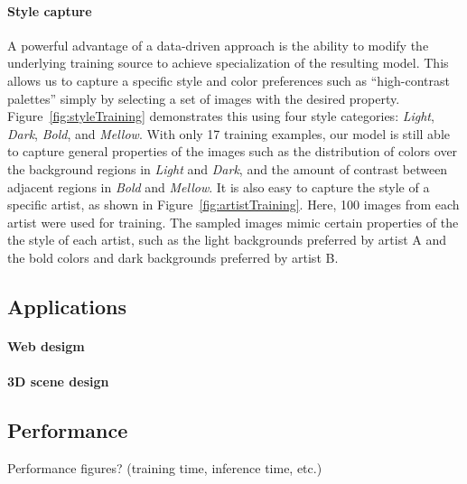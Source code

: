 \paragraph{Style capture} A powerful advantage of a data-driven approach is the ability to modify the underlying training source to achieve specialization of the resulting model. This allows us to capture a specific style and color preferences such as ``high-contrast palettes'' simply by selecting a set of images with the desired property. Figure~\ref{fig:styleTraining} demonstrates this using four style categories: \emph{Light}, \emph{Dark}, \emph{Bold}, and \emph{Mellow}. With only 17 training examples, our model is still able to capture general properties of the images such as the distribution of colors over the background regions in \emph{Light} and \emph{Dark}, and the amount of contrast between adjacent regions in \emph{Bold} and \emph{Mellow}. It is also easy to capture the style of a specific artist, as shown in Figure~\ref{fig:artistTraining}. Here, 100 images from each artist were used for training. The sampled images mimic certain properties of the the style of each artist, such as the light backgrounds preferred by artist A and the bold colors and dark backgrounds preferred by artist B.

\subsection{Applications}

\paragraph{Web desigm}

\paragraph{3D scene design}

\subsection{Performance}

Performance figures? (training time, inference time, etc.)